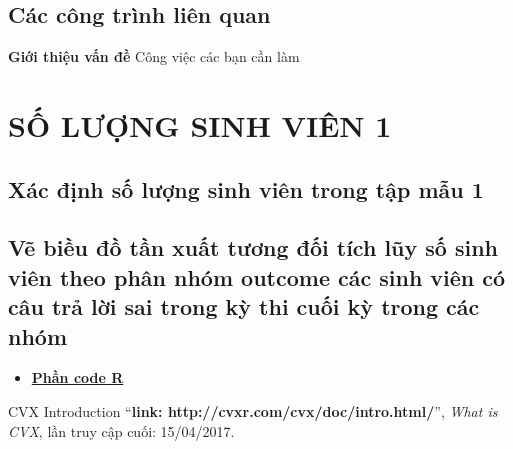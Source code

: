 \documentclass[a4paper]{article}
\begin{document}
	\subsection{Các công trình liên quan}
	\textbf{ Giới thiệu vấn đề}
	Công việc các bạn cần làm

\newpage
\section{SỐ LƯỢNG SINH VIÊN 1}
\subsection{Xác định số lượng sinh viên trong tập mẫu 1}
\newpage
\subsection{Vẽ biều đồ tần xuất tương đối tích lũy số sinh viên theo phân nhóm outcome các sinh viên có câu trả lời sai trong kỳ thi cuối kỳ trong các nhóm}
\begin{itemize}
    \item \large\bfseries\underline {Phần code R} \newline
\end{itemize}

\newpage
\begin{thebibliography}{80}

CVX Introduction
``\textbf{link: http://cvxr.com/cvx/doc/intro.html/}'',
\textit{What is CVX}, lần truy cập cuối: 15/04/2017.

\end{thebibliography}
\end{document}
